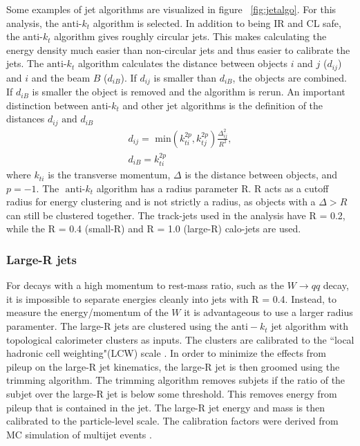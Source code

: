 \indent Some examples of jet algorithms are visualized in figure ~\ref{fig:jetalgo}. For this analysis, the ${\text{anti-}k_{t}}$ algorithm is selected. In addition to being IR and CL safe, the ${\text{anti-}k_{t}}$ algorithm gives roughly circular jets. This makes calculating the energy density much easier than non-circular jets and thus easier to calibrate the jets. The ${\text{anti-}k_{t}}$ algorithm calculates the distance between objects $i$ and $j$ ($d_{ij}$) and $i$ and the beam $B$ ($d_{iB}$). If ${d_{ij}}$ is smaller than ${d_{iB}}$, the objects are combined. If ${d_{iB}}$ is smaller the object is removed and the algorithm is rerun. An important distinction between ${\textrm{anti-}k_{t}}$ and other jet algorithms is the definition of the distances ${d_{ij}\text{ and } d_{iB}}$
\begin{equation}
\begin{split}
d_{ij} = \text{ min}(k^{2p}_{ti},k^{2p}_{tj})\frac{\Delta^{2}_{ij}}{R^{2}},\\
d_{iB} = k^{2p}_{ti}
\end{split}
\end{equation}
where ${k_{ti}}$ is the transverse momentum, ${\Delta}$ is the distance between objects, and ${p=-1}$. The ${\text{ anti-}k_{t}}$ algorithm has a radius parameter R. R acts as a cutoff radius for energy clustering and is not strictly a radius, as objects with a ${\Delta > R}$ can still be clustered together. The track-jets used in the analysis have R = 0.2, while the R = 0.4 (small-R) and R = 1.0 (large-R) calo-jets are used. 
\subsubsection{Large-R jets}
For decays with a high momentum to rest-mass ratio, such as the $W\rightarrow qq$ decay, it is impossible to separate energies cleanly into jets with R = 0.4. Instead, to measure the energy/momentum of the $W$ it is advantageous to use a larger radius paramenter. The large-R jets are clustered using the ${\mathrm{anti-}k_{t}}$ jet algorithm \cite{antikt_algorithm} with topological calorimeter clusters as inputs. The clusters are calibrated to the ``local hadronic cell weighting"(LCW) scale \cite{ATLAS-TopoClustering}.
In order to minimize the effects from pileup on the large-R jet kinematics, the large-R jet is then groomed
using the trimming algorithm. The trimming algorithm removes subjets if the ratio of the subjet \pt over the large-R jet \pt is below some threshold\cite{Krohn:2009th}. This removes energy from pileup that is contained in the jet. The large-R jet energy and mass is then calibrated to the particle-level
scale. The calibration factors were derived from MC simulation of multijet events \cite{ATLAS-CONF-2016-035}.\newline
